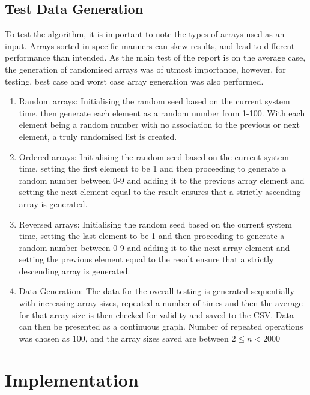 \documentclass[]{article}
\begin{document}
\subsection{Test Data Generation}
To test the algorithm, it is important to note the types of arrays used as an input. Arrays sorted in specific manners can skew results, and lead to different performance than intended. As the main test of the report is on the average case, the generation of randomised arrays was of utmost importance, however, for testing, best case and worst case array generation was also performed. 

\begin{enumerate}
	\item Random arrays: Initialising the random seed based on the current system time, then generate each element as a random number from 1-100. With each element being a random number with no association to the previous or next element, a truly randomised list is created.
	\item Ordered arrays: Initialising the random seed based on the current system time, setting the first element to be 1 and then proceeding to generate a random number between 0-9 and adding it to the previous array element and setting the next element equal to the result ensures that a strictly ascending array is generated.
	\item Reversed arrays: Initialising the random seed based on the current system time, setting the last element to be 1 and then proceeding to generate a random number between 0-9 and adding it to the next array element and setting the previous element equal to the result ensure that a strictly descending array is generated.
	\item Data Generation: The data for the overall testing is generated sequentially with increasing array sizes, repeated a number of times and then the average for that array size is then checked for validity and saved to the CSV. Data can then be presented as a continuous graph. Number of repeated operations was chosen as 100, and the array sizes saved are between $2\le n < 2000$
\end{enumerate}
\section{Implementation}
\end{document}
